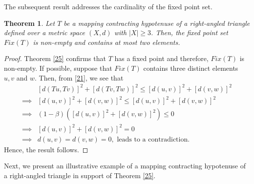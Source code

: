 \documentclass[11pt,reqno,a4paper]{amsart}
\theoremstyle{plain}
\newtheorem{theorem}{Theorem}[section]
\theoremstyle{definition}
\theoremstyle{remark}
\numberwithin{equation}{section}
\begin{document}
The subsequent result addresses the cardinality of the fixed point set.
\begin{theorem}\label{26}
Let $T$ be a mapping contracting hypotenuse of a right-angled triangle defined over a metric space $(X,d)$ with $|X|\ge 3$. Then, the fixed point set $Fix(T)$ is non-empty and contains at most two elements.
\end{theorem}

\begin{proof}
Theorem \ref{25} confirms that $T$ has a fixed point and therefore, $Fix(T)$ is non-empty. If possible, suppose that $Fix(T)$ contains three distinct elements $u,v$ and $w$. Then, from  \eqref{21}, we see that
\begin{align*}
& [d(Tu,Tv)]^2+[d(Tv,Tw)]^2 \le [d(u,v)]^2+[d(v,w)]^2\\
\implies &[d(u,v)]^2+[d(v,w)]^2 \le [d(u,v)]^2+[d(v,w)]^2\\
\implies &(1-\beta)([d(u,v)]^2+[d(v,w)]^2) \le 0\\
\implies &[d(u,v)]^2+[d(v,w)]^2 =0\\
\implies &d(u,v)=d(v,w) =0, \text{ leads to a contradiction}.
\end{align*}
Hence, the result follows.
\end{proof}
Next, we present an illustrative example of a mapping contracting hypotenuse of a right-angled triangle in support of Theorem \ref{25}.
\end{document}

